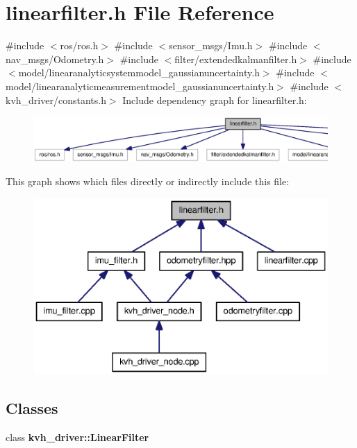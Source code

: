 \section{linearfilter.\-h \-File \-Reference}
\label{linearfilter_8h}
{\ttfamily \#include $<$ros/ros.\-h$>$}\*
{\ttfamily \#include $<$sensor\-\_\-msgs/\-Imu.\-h$>$}\*
{\ttfamily \#include $<$nav\-\_\-msgs/\-Odometry.\-h$>$}\*
{\ttfamily \#include $<$filter/extendedkalmanfilter.\-h$>$}\*
{\ttfamily \#include $<$model/linearanalyticsystemmodel\-\_\-gaussianuncertainty.\-h$>$}\*
{\ttfamily \#include $<$model/linearanalyticmeasurementmodel\-\_\-gaussianuncertainty.\-h$>$}\*
{\ttfamily \#include $<$kvh\-\_\-driver/constants.\-h$>$}\*
\-Include dependency graph for linearfilter.\-h\-:
\nopagebreak
\begin{figure}[H]
\begin{center}
\leavevmode
\includegraphics[width=350pt]{linearfilter_8h__incl}
\end{center}
\end{figure}
\-This graph shows which files directly or indirectly include this file\-:
\nopagebreak
\begin{figure}[H]
\begin{center}
\leavevmode
\includegraphics[width=350pt]{linearfilter_8h__dep__incl}
\end{center}
\end{figure}
\subsection*{\-Classes}
\begin{DoxyCompactItemize}
\item 
class {\bf kvh\-\_\-driver\-::\-Linear\-Filter}
\end{DoxyCompactItemize}
